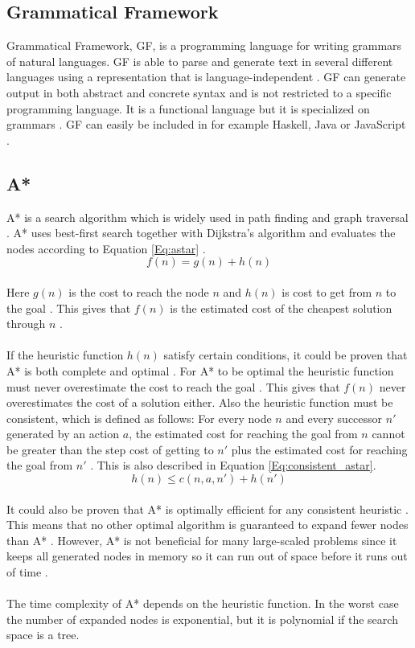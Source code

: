 \subsection{Grammatical Framework}
Grammatical Framework, GF, is a programming language for writing grammars of
natural languages. GF is able to parse and generate text in several different
languages using a representation that is language-independent \citep{gf_url}.
GF can generate output in both abstract and concrete syntax and is not
restricted to a specific programming language. It is a functional language but
it is specialized on grammars \citep{gf_url}. 
GF can easily be included in for example Haskell, Java or JavaScript \citep{gf_url}.

\subsection{A*}
A* is a search algorithm which is widely used in path finding and graph
traversal \citep{astar_url}. A* uses best-first search together with Dijkstra's
algorithm and evaluates the nodes according to Equation \ref{Eq:astar}
\citep{astar_url}. \\
\begin{equation}
f(n) = g(n) + h(n)
\label{Eq:astar}
\end{equation}\\
Here $g(n)$ is the cost to reach the node $n$ and $h(n)$ is cost to get from $n$
to the goal \citep{astar_url}. This gives that $f(n)$ is the estimated
cost of the cheapest solution through $n$ \citep{astar_url}. 
\\\\
If the heuristic function $h(n)$ satisfy certain conditions, it could be proven
that A* is both complete and optimal \citep{astar_ai}. For A* to be optimal the
heuristic function must never overestimate the cost to reach the goal
\citep{astar_ai}. This gives that $f(n)$ never overestimates the cost of a
solution either. Also the heuristic function must be consistent, which is
defined as follows: For every node $n$ and every successor $n'$ generated by an
action $a$, the estimated cost for reaching the goal from $n$ cannot be greater
than the step cost of getting to $n'$ plus the estimated cost for reaching the
goal from $n'$ \citep{astar_ai}. This is also described in Equation
\ref{Eq:consistent_astar}.\\
\begin{equation}
h(n) \leq c(n, a, n') + h(n')
\label{Eq:consistent_astar}
\end{equation}\\
It could also be proven that A* is optimally efficient for any consistent
heuristic \citep{astar_ai}. This means that no other optimal algorithm is
guaranteed to expand fewer nodes than A* \citep{astar_ai}. However, A* is not
beneficial for many large-scaled problems since it keeps all generated nodes in
memory so it can run out of space before it runs out of time
\citep{astar_ai}.\\\\ The time complexity of A* depends on the heuristic
function. In the worst case the number of expanded nodes is exponential, but it
is polynomial if the search space is a tree.
